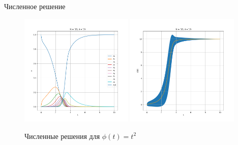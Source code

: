 \begin{frame}{Численное решение}
{			\begin{figure}
				\centering
				\includegraphics[width=0.48\textwidth, keepaspectratio]{../img/numeric_sol/probabilities_N_10_lambda_10_poly.png}
				\includegraphics[width=0.48\textwidth, keepaspectratio]{../img/numeric_sol/avers_N_10_lambda_10_poly.png}
				\caption{Численные решения для $ \phi(t) = t^2 $}
			\end{figure}
		}
		
\end{frame}

